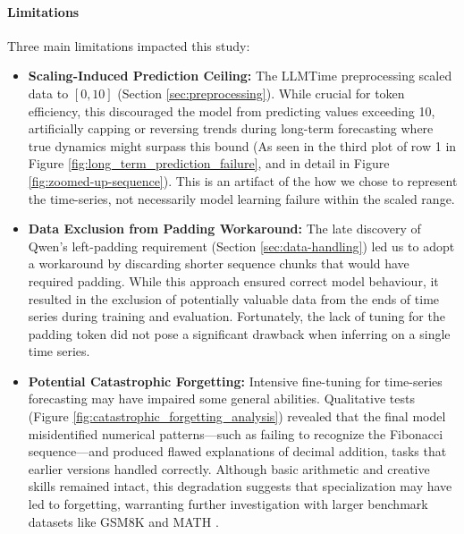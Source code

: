 \documentclass{article}
\begin{document}
\paragraph{Limitations}
Three main limitations impacted this study:
\begin{itemize}
    \item \textbf{Scaling-Induced Prediction Ceiling:} The LLMTime preprocessing scaled data to $[0, 10]$ (Section \ref{sec:preprocessing}). While crucial for token efficiency, this discouraged the model from predicting values exceeding 10, artificially capping or reversing trends during long-term forecasting where true dynamics might surpass this bound (As seen in the third plot of row 1 in Figure \ref{fig:long_term_prediction_failure}, and in detail in Figure \ref{fig:zoomed-up-sequence}). This is an artifact of the how we chose to represent the time-series, not necessarily model learning failure within the scaled range.
    \item \textbf{Data Exclusion from Padding Workaround:} The late discovery of Qwen's left-padding requirement (Section \ref{sec:data-handling}) led us to adopt a workaround by discarding shorter sequence chunks that would have required padding. While this approach ensured correct model behaviour, it resulted in the exclusion of potentially valuable data from the ends of time series during training and evaluation. Fortunately, the lack of tuning for the padding token did not pose a significant drawback when inferring on a single time series.
    \item \textbf{Potential Catastrophic Forgetting:} Intensive fine-tuning for time-series forecasting may have impaired some general abilities. Qualitative tests (Figure \ref{fig:catastrophic_forgetting_analysis}) revealed that the final model misidentified numerical patterns—such as failing to recognize the Fibonacci sequence—and produced flawed explanations of decimal addition, tasks that earlier versions handled correctly. Although basic arithmetic and creative skills remained intact, this degradation suggests that specialization may have led to forgetting, warranting further investigation with larger benchmark datasets like GSM8K \cite{cobbe2021trainingverifierssolvemath} and MATH \cite{hendrycks2021measuringmathematicalproblemsolving}.
\end{itemize}
\end{document}
